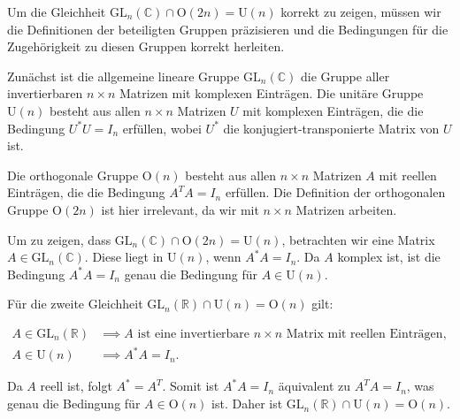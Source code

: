 Um die Gleichheit $\mathrm{GL}_n(\mathbb{C}) \cap \mathrm{O}(2n) = \mathrm{U}(n)$ korrekt zu zeigen, müssen wir die Definitionen der beteiligten Gruppen präzisieren und die Bedingungen für die Zugehörigkeit zu diesen Gruppen korrekt herleiten.

Zunächst ist die allgemeine lineare Gruppe $\mathrm{GL}_n(\mathbb{C})$ die Gruppe aller invertierbaren $n \times n$ Matrizen mit komplexen Einträgen. Die unitäre Gruppe $\mathrm{U}(n)$ besteht aus allen $n \times n$ Matrizen $U$ mit komplexen Einträgen, die die Bedingung $U^* U = I_n$ erfüllen, wobei $U^*$ die konjugiert-transponierte Matrix von $U$ ist.

Die orthogonale Gruppe $\mathrm{O}(n)$ besteht aus allen $n \times n$ Matrizen $A$ mit reellen Einträgen, die die Bedingung $A^T A = I_n$ erfüllen. Die Definition der orthogonalen Gruppe $\mathrm{O}(2n)$ ist hier irrelevant, da wir mit $n \times n$ Matrizen arbeiten.

Um zu zeigen, dass $\mathrm{GL}_n(\mathbb{C}) \cap \mathrm{O}(2n) = \mathrm{U}(n)$, betrachten wir eine Matrix $A \in \mathrm{GL}_n(\mathbb{C})$. Diese liegt in $\mathrm{U}(n)$, wenn $A^* A = I_n$. Da $A$ komplex ist, ist die Bedingung $A^* A = I_n$ genau die Bedingung für $A \in \mathrm{U}(n)$.

Für die zweite Gleichheit $\mathrm{GL}_n(\mathbb{R}) \cap \mathrm{U}(n) = \mathrm{O}(n)$ gilt:

\begin{align*}
A \in \mathrm{GL}_n(\mathbb{R}) &\implies A \text{ ist eine invertierbare } n \times n \text{ Matrix mit reellen Einträgen}, \\
A \in \mathrm{U}(n) &\implies A^* A = I_n.
\end{align*}

Da $A$ reell ist, folgt $A^* = A^T$. Somit ist $A^* A = I_n$ äquivalent zu $A^T A = I_n$, was genau die Bedingung für $A \in \mathrm{O}(n)$ ist. Daher ist $\mathrm{GL}_n(\mathbb{R}) \cap \mathrm{U}(n) = \mathrm{O}(n)$.

